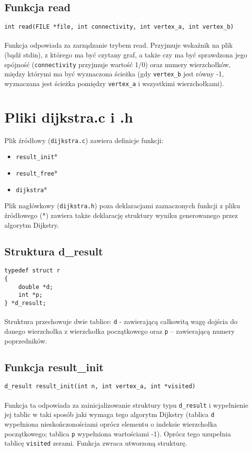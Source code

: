 \documentclass[11pt,a4paper]{report}
\begin{document}
    \subsection{Funkcja read}
    \verb|int read(FILE *file, int connectivity, int vertex_a, int vertex_b)|\\
    \\
    Funkcja odpowiada za zarządzanie trybem read. Przyjmuje wskaźnik na plik (bądź stdin), z którego ma być czytany graf, a także czy ma być sprawdzona jego spójność (\verb|connectivity| przyjmuje wartość 1/0) oraz numery wierzchołków, między którymi ma być wyznaczona ścieżka (gdy \verb|vertex_b| jest równy -1, wyznaczana jest ścieżka pomiędzy \verb|vertex_a| i wszystkimi wierzchołkami).

    \newpage
    \section{Pliki dijkstra.c i .h}
    Plik źródłowy (\verb|dijkstra.c|) zawiera definicje funkcji:
    \begin{itemize}
        \item \verb|result_init|*
        \item \verb|result_free|*
        \item \verb|dijkstra|*
    \end{itemize}
    Plik nagłówkowy (\verb|dijkstra.h|) poza deklaracjami zaznaczonych funkcji z pliku źródłowego (*) zawiera także deklarację struktury wyniku generowanego przez algorytm Dijkstry.\\
    \subsection{Struktura d\_result}
    \verb|typedef struct r|\\
    \verb|{|\\
    \verb|    double *d;|\\
    \verb|    int *p;|\\
    \verb|} *d_result;|\\
    \\
    Struktura przechowuje dwie tablice: \verb|d| - zawierającą całkowitą wagę dojścia do danego wierzchołka z wierzchołka początkowego oraz \verb|p| – zawierającą numery poprzedników.\\
    \subsection{Funkcja result\_init}
    \verb|d_result result_init(int n, int vertex_a, int *visited)|\\
    \\
    Funkcja ta odpowiada za zainicjalizowanie struktury typu \verb|d_result| i wypełnienie jej tablic w taki sposób jaki wymaga tego algorytm Dijkstry (tablica \verb|d| wypełniona nieskończonościami oprócz elementu o indeksie wierzchołka początkowego; tablica \verb|p| wypełniona wartościami -1). Oprócz tego uzupełnia tablicę \verb|visited| zerami. Funkcja zwraca utworzoną strukturę.\\
\end{document}
